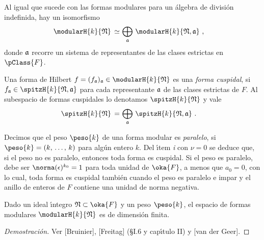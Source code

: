 Al igual que sucede con las formas modulares para un \'{a}lgebra de
divisi\'{o}n indefinida, hay un isomorfismo
%
\begin{align*}
	\modularH{k}{\frak{N}} \,\simeq\, & \bigoplus_{\frak{a}}\,
	\modularH{k}{\frak{N},\frak{a}}
	\text{ ,}
\end{align*}
%
donde $\frak{a}$ recorre un sistema de representantes de las clases
estrictas en $\pClass{F}$.

\begin{defHilbertModularHilbertCuspForm}
	Una forma de Hilbert $f=(f_{\frak{a}})_{\frak{a}}\in%
	\modularH{k}{\frak{N}}$ es una \emph{forma cuspidal}, si
	$f_{\frak{a}}\in\spitzH{k}{\frak{N},\frak{a}}$ para cada
	representante $\frak{a}$ de las clases estrictas de $F$.
	Al subespacio de formas cuspidales lo denotamos
	$\spitzH{k}{\frak{N}}$ y vale
	\begin{align*}
		\spitzH{k}{\frak{N}} \,=\, & \bigoplus_{\frak{a}}\,
		\spitzH{k}{\frak{N},\frak{a}}
		\text{ .}
	\end{align*}
\end{defHilbertModularHilbertCuspForm}

\begin{obsCuandoNoEsParalelo}
	Decimos que el peso $\peso{k}$ de una forma modular es
	\emph{paralelo}, si $\peso{k}=(k,\,\dots,\,k)$ para
	alg\'{u}n entero $k$. Del \'{\i}tem \textit{i} con $\nu=0$
	se deduce que, si el peso no es paralelo, entonces toda forma
	es cuspidal. Si el peso es paralelo, debe ser
	$\norma(\epsilon)^{k_{0}}=1$ para toda unidad de $\oka{F}$, a
	menos que $a_{0}=0$, con lo cual, toda forma es cuspidal
	tambi\'{e}n cuando el peso es paralelo e impar y el anillo de
	enteros de $F$ contiene una unidad de norma negativa.
\end{obsCuandoNoEsParalelo}

\begin{teoLaDimEsFinitaHilbert}
	Dado un ideal \'{\i}ntegro $\frak{N}\subset\oka{F}$ y un peso
	$\peso{k}$, el espacio de formas modulares $\modularH{k}{\frak{N}}$
	es de dimensi\'{o}n finita.
\end{teoLaDimEsFinitaHilbert}

\begin{proof}[Demostraci\'{o}n]
	Ver [Bruinier], [Freitag] (\S I.6 y cap\'{\i}tulo II) y
	[van der Geer].
\end{proof}

